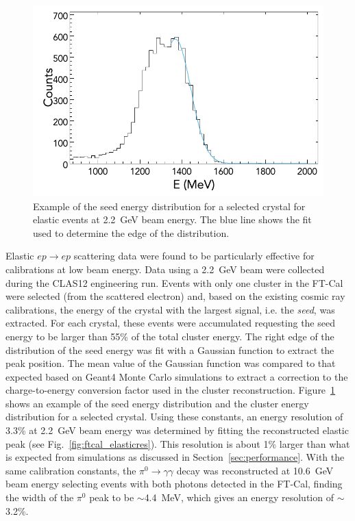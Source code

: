 \begin{figure}
\includegraphics[width=0.9\columnwidth]{fig/ftcal_elastic_seed.png}
\caption{Example of the seed energy distribution for a selected crystal for elastic events at 2.2~GeV beam energy.
  The blue line shows the fit used to determine the edge of the distribution.}
\label{fig:ftcal_elasticcal}
\end{figure}

Elastic $ep \to ep$ scattering data were found to be particularly effective for calibrations at low beam energy. Data
using a 2.2~GeV beam were collected during the CLAS12 engineering run. Events with only one cluster in the FT-Cal
were selected (from the scattered electron) and, based on the existing cosmic ray calibrations, the energy of the
crystal with the largest signal, i.e. the {\it seed}, was extracted. For each crystal, these events were accumulated
requesting the seed energy to be larger than 55\% of the total cluster energy. The right edge of the distribution of
the seed energy was fit with a Gaussian function to extract the peak position. The mean value of the Gaussian
function was compared to that expected based on Geant4 Monte Carlo simulations to extract a correction to the
charge-to-energy conversion factor used in the cluster reconstruction. Figure~\ref{fig:ftcal_elasticcal} shows an
example of the seed energy distribution and the cluster energy distribution for a selected crystal. Using these
constants, an energy resolution of 3.3\% at 2.2~GeV beam energy was determined by fitting the reconstructed
elastic peak (see Fig.~\ref{fig:ftcal_elasticres}). This resolution is about 1\% larger than what is expected from
simulations as discussed in Section~\ref{sec:performance}. With the same calibration constants, the
$\pi^0\to\gamma\gamma$ decay was reconstructed at 10.6~GeV beam energy selecting events with both photons
detected in the FT-Cal, finding the width of the $\pi^0$ peak to be $\sim$4.4~MeV, which gives an energy
resolution of $\sim$3.2\%.

